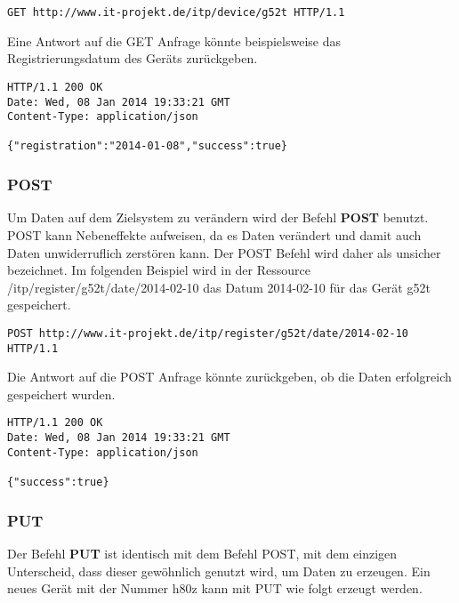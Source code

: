 \begin{lstlisting}[caption={Beispiel HTTP GET Anfrage bei RESTful WebServices}]
GET http://www.it-projekt.de/itp/device/g52t HTTP/1.1
\end{lstlisting} 

Eine Antwort auf die GET Anfrage könnte beispielsweise das Registrierungsdatum des Geräts zurückgeben.

\begin{lstlisting}[caption={Beispiel Antwort auf die HTTP GET Anfrage}]
HTTP/1.1 200 OK
Date: Wed, 08 Jan 2014 19:33:21 GMT
Content-Type: application/json

{"registration":"2014-01-08","success":true}
\end{lstlisting} 

\subsubsection{POST}
Um Daten auf dem Zielsystem zu verändern wird der Befehl \textbf{POST} benutzt. POST kann Nebeneffekte aufweisen, da es Daten verändert und damit auch Daten unwiderruflich zerstören kann. Der POST Befehl wird daher als unsicher bezeichnet. Im folgenden Beispiel wird in der Ressource \dq{}/itp/register/g52t/date/2014-02-10\dq{} das Datum \dq{}2014-02-10\dq{} für das Gerät \dq{}g52t\dq{} gespeichert.

\begin{lstlisting}[caption={Beispiel HTTP GET Anfrage bei RESTful WebServices}]
POST http://www.it-projekt.de/itp/register/g52t/date/2014-02-10 HTTP/1.1
\end{lstlisting} 

Die Antwort auf die POST Anfrage könnte zurückgeben, ob die Daten erfolgreich gespeichert wurden.

\begin{lstlisting}[caption={Beispiel Antwort auf die HTTP POST Anfrage}]
HTTP/1.1 200 OK
Date: Wed, 08 Jan 2014 19:33:21 GMT
Content-Type: application/json

{"success":true}
\end{lstlisting} 

\subsubsection{PUT}
Der Befehl \textbf{PUT} ist identisch mit dem Befehl POST, mit dem einzigen Unterscheid, dass dieser gewöhnlich genutzt wird, um Daten zu erzeugen. Ein neues Gerät mit der Nummer \dq{}h80z\dq{} kann mit PUT wie folgt erzeugt werden.

